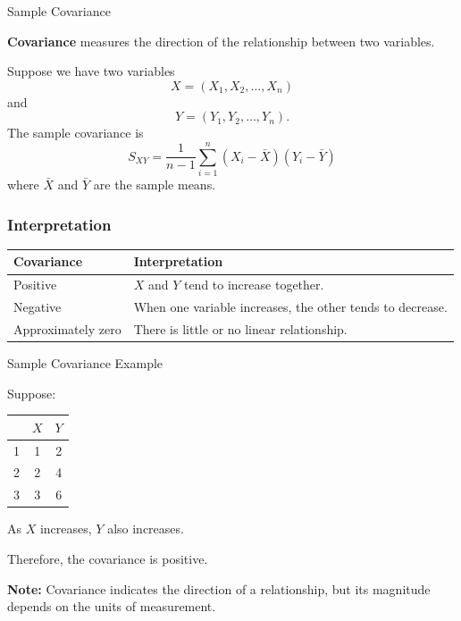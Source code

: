 \documentclass[aspectratio=169]{beamer}
\begin{document}
\begin{frame}{Sample Covariance}

\textbf{Covariance} measures the direction of the relationship between
two variables.

Suppose we have two variables
\vspace{0.0 cm}
\[
X=(X_1,X_2,\ldots,X_n)
\]
\vspace{0.0 cm}
and
\vspace{0.0 cm}
\[
Y=(Y_1,Y_2,\ldots,Y_n).
\]
\vspace{0.0 cm}
The sample covariance is
\vspace{0.0 cm}
\[
\boxed{
S_{XY}
=
\frac{1}{n-1}
\sum_{i=1}^{n}
(X_i-\bar{X})(Y_i-\bar{Y})
}
\]
\vspace{0.0 cm}
where $\bar{X}$ and $\bar{Y}$ are the sample means.

\subsubsection*{Interpretation}

\begin{center}
\begin{tabular}{p{3cm}p{8cm}}
\toprule
\textbf{Covariance} & \textbf{Interpretation}\\
\midrule
Positive & $X$ and $Y$ tend to increase together.\\
Negative & When one variable increases, the other tends to decrease.\\
Approximately zero & There is little or no linear relationship.\\
\bottomrule
\end{tabular}
\end{center}
\end{frame}
\begin{frame}{Sample Covariance Example}

Suppose:

\begin{center}
\begin{tabular}{ccc}
\toprule
 & $X$ & $Y$\\
\midrule
1 & 1 & 2\\
2 & 2 & 4\\
3 & 3 & 6\\
\bottomrule
\end{tabular}
\end{center}

As $X$ increases, $Y$ also increases.
\item Therefore, the covariance is
positive.

\textbf{Note:} Covariance indicates the direction of a relationship,
but its magnitude depends on the units of measurement.
\end{frame}
\end{document}
